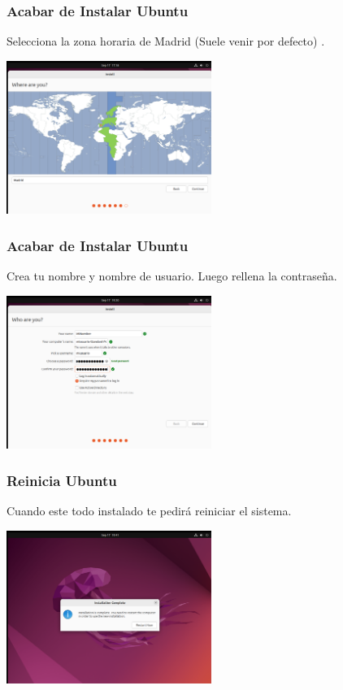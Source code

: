 \documentclass[10pt]{beamer}
\begin{document}
	\begin{frame}
		\frametitle{Acabar de Instalar Ubuntu}
		Selecciona la zona horaria de Madrid (Suele venir por defecto)
		.
		\begin{center}
			\includegraphics[width=0.5\textwidth]{timezone}
		\end{center}
	\end{frame}
	
	\begin{frame}
		\frametitle{Acabar de Instalar Ubuntu}
		Crea tu nombre y nombre de usuario. Luego rellena la contraseña.
		\begin{center}
			\includegraphics[width=0.5\textwidth]{login}
		\end{center}
	\end{frame}
	
	\begin{frame}
		\frametitle{Reinicia Ubuntu}
		Cuando este todo instalado te pedirá reiniciar el sistema.
		\begin{center}
			\includegraphics[width=0.5\textwidth]{restart}
		\end{center}
	\end{frame}
	
\end{document}
